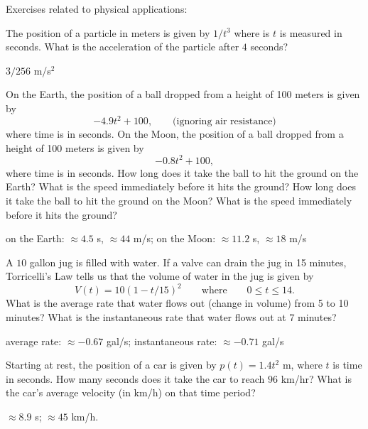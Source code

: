 



\begin{exercises}

\noindent Exercises related to physical applications:


\begin{exercise}
The position of a particle in meters is given by $1/t^3$ where is $t$
is measured in seconds. What is the acceleration of the particle after
$4$ seconds?
\begin{answer}
$3/256$ m/s$^2$
\end{answer}
\end{exercise}

\begin{exercise}
On the Earth, the position of a ball dropped from a height of 100
meters is given by
\[
-4.9t^2+100,\qquad\text{(ignoring air resistance)}
\]
where time is in seconds.  On the Moon, the position of a ball dropped
from a height of 100 meters is given by
\[
-0.8t^2+100,
\]
where time is in seconds.  How long does it take the ball to hit the
ground on the Earth? What is the speed immediately before it hits the
ground? How long does it take the ball to hit the ground on the Moon?
What is the speed immediately before it hits the ground?
\begin{answer}
on the Earth: $\approx 4.5$ s, $\approx 44$ m/s; on the Moon: $\approx
11.2$ s, $\approx 18$ m/s
\end{answer}
\end{exercise}

\begin{exercise}
A $10$ gallon jug is filled with water. If a valve can drain the jug
in 15 minutes, Torricelli's Law tells us that the volume of water in the jug is given by
\[
V(t) = 10\left(1-t/15\right)^2 \qquad\text{where}\qquad 0\le t\le 14. 
\]
What is the average rate that water flows out (change in volume) from
5 to 10 minutes? What is the instantaneous rate that water flows out at
7 minutes?
\begin{answer}
average rate: $\approx -0.67$ gal/s; instantaneous rate: $\approx-0.71$
gal/s
\end{answer}
\end{exercise}

\begin{exercise}
Starting at rest, the position of a car is given by $p(t) = 1.4t^2$ m,
where $t$ is time in seconds.  How many seconds does it take the car to reach
$96$ km/hr? What is the car's average velocity (in km/h) on that time period?
\begin{answer}
$\approx 8.9$ s; $\approx 45$ km/h.
\end{answer}
\end{exercise}


\end{exercises}
